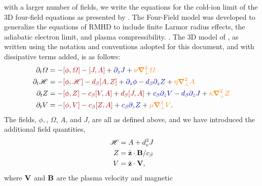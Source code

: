 \documentclass[12pt]{memoir}
\newcommand{\hfield}{\mathscr{H}}
\begin{document}
with a larger number of fields, we write the equations for the cold-ion limit of
the 3D four-field equations as presented by \citet{Tassietal2010}. The Four-Field
model was developed to generalize the equations of RMHD to include finite Larmor
radius effects, the adiabatic electron limit, and plasma compressibility.
\citep{Hazeltineetal85,Hazeltineetal87}. The 3D model of \citet{Tassietal2010},
as written using the notation and conventions adopted for this document, and with
dissipative terms added, is as follows:
%
\begin{subequations}
\begin{align}
\pardt \Omega &= - {\color{red!65!black}[\phi,\Omega]}    - {\color{red!65!black}[J,A]}
                 + {\color{blue!65!black} \pardz J}
                 + {\color{orange}\nu\delperp^2   \Omega} \label{eq:ffomega}                           \\
\pardt\hfield &= - {\color{red!65!black}[\phi,\hfield]}   - {\color{red!65!black}d_\beta[A,Z]}
                 + {\color{blue!65!black}\pardz\phi}      - {\color{blue!65!black}d_\beta\pardz Z}
                 + {\color{orange}\eta\delperp^2   A}     \label{eq:ffh}                               \\
\pardt Z      &= - {\color{red!65!black}[\phi,Z]}         - {\color{red!65!black}c_\beta[V,A]} + {\color{red!65!black}d_\beta[J,A]}
                 + {\color{blue!65!black}c_\beta\pardz V} - {\color{blue!65!black}d_\beta\pardz J}
                 + {\color{orange}\kappa\delperp^2 Z}     \label{eq:ffz}                               \\
\pardt V      &= - {\color{red!65!black}[\phi,V]}         - {\color{red!65!black}c_\beta[Z,A]}
                 + {\color{blue!65!black}c_\beta\pardz Z}
                 + {\color{orange}\mu\delperp^2    V}.    \label{eq:ffv}
\end{align}
\end{subequations}
%
The fields, $\phi,$, $\Omega$, $A$, and $J$, are all as defined
above, and we have introduced the additional field quantities,
%
\begin{subequations}
  \begin{align}
    \hfield &= A + d_e^2 J               \label{eq:defh} \\
     Z      &= \zhat\cdot \Bvec/c_\beta  \label{eq:defz} \\
     V      &= \zhat\cdot \Vvec,         \label{eq:defv}
  \end{align}
\end{subequations}
%
where $\mathbf{V}$ and $\mathbf{B}$ are the plasma velocity and magnetic
\end{document}
